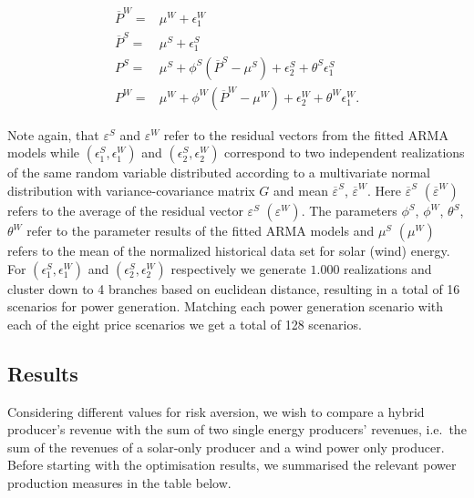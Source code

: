 \begin{align}
\overline{P}^{W}=& \mu^W+\epsilon_1^W\\
\overline{P}^{S}=& \mu^S+\epsilon_1^S\\
{P}^{S}=&\mu^S + \phi^S \left(\overline{P}^{S}-\mu^S\right)+\epsilon^S_2 + \theta^S\epsilon^S_1\\
{P}^{W}=&\mu^W + \phi^W \left(\overline{P}^{W}-\mu^W\right)+\epsilon^W_2 + \theta^W\epsilon^W_1.
\end{align}


Note again, that $\varepsilon^S$ and $\varepsilon^W$ refer to the residual vectors from the fitted ARMA models while $\left(\epsilon_1^S,\epsilon_1^W\right)$ and $\left(\epsilon_2^S,\epsilon_2^W\right)$ correspond to two independent realizations of the same random variable distributed according to a multivariate normal distribution with variance-covariance matrix $G$ and mean $\overline{\varepsilon}^S$, $\overline{\varepsilon}^W$. Here $\overline{\varepsilon}^S$ $\left(\overline{\varepsilon}^W\right)$ refers to the average of the residual vector $\varepsilon^S$ $\left(\varepsilon^W\right)$. The parameters $\phi^S$, $\phi^W$, $\theta^S$, $\theta^W$ refer to the parameter results of the fitted ARMA models and $\mu^S$ $\left(\mu^W\right)$ refers to the mean of the normalized historical data set for solar (wind) energy. For $\left(\epsilon_1^S,\epsilon_1^W\right)$ and $\left(\epsilon_2^S,\epsilon_2^W\right)$ respectively we generate $1.000$ realizations and cluster down to 4 branches based on euclidean distance, resulting in a total of 16 scenarios for power generation. Matching each power generation scenario with each of the eight price scenarios we get a total of 128 scenarios.




\subsection{Results}





Considering different values for risk aversion, we wish to compare a hybrid producer's revenue with the sum of two single energy producers' revenues, i.e.\ the sum of the revenues of a solar-only producer and a wind power only producer. Before starting with the optimisation results, we summarised the relevant power production measures in the table below. 



